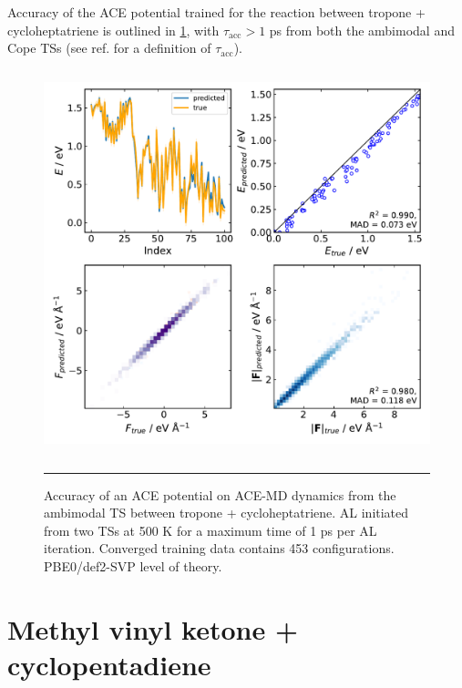 \documentclass[11pt]{article}
\numberwithin{equation}{subsection}
\newcommand{\tacc}{$\tau_\text{acc}$}
\begin{document}
Accuracy of the ACE potential trained for the reaction between tropone + cycloheptatriene is outlined in \figurename{ \ref{fig::SX33}}, with \tacc $>1$ ps from both the ambimodal and Cope TSs (see ref. \cite{Young2021gap} for a definition of \tacc).

\begin{figure}[h!]
	\centering
	\vspace{0.4cm}
	\includegraphics[height=11.2cm]{figSX33.pdf}
	\vspace{0.1cm}
	\hrule
	\vspace{0.1cm}
	\caption{Accuracy of an ACE potential on ACE-MD dynamics from the ambimodal TS between tropone + cycloheptatriene. AL initiated from two TSs at 500 K for a maximum time of 1 ps per AL iteration. Converged training data contains 453 configurations. PBE0/def2-SVP level of theory.}
	\label{fig::SX33}
\end{figure}



\clearpage 
\section{Methyl vinyl ketone + cyclopentadiene} \label{section::SI_umbrellal_R2}
\end{document}
